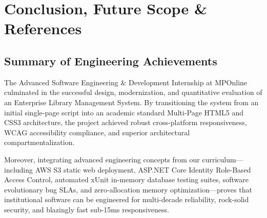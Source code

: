 \documentclass[11pt,a4paper]{report}
\begin{document}
\newpage

\chapter{Conclusion, Future Scope \& References}

\section{Summary of Engineering Achievements}
The Advanced Software Engineering \& Development Internship at MPOnline culminated in the successful design, modernization, and quantitative evaluation of an Enterprise Library Management System. By transitioning the system from an initial single-page script into an academic standard Multi-Page HTML5 and CSS3 architecture, the project achieved robust cross-platform responsiveness, WCAG accessibility compliance, and superior architectural compartmentalization.

Moreover, integrating advanced engineering concepts from our curriculum---including AWS S3 static web deployment, ASP.NET Core Identity Role-Based Access Control, automated xUnit in-memory database testing suites, software evolutionary bug SLAs, and zero-allocation memory optimization---proves that institutional software can be engineered for multi-decade reliability, rock-solid security, and blazingly fast sub-15ms responsiveness.
\end{document}
